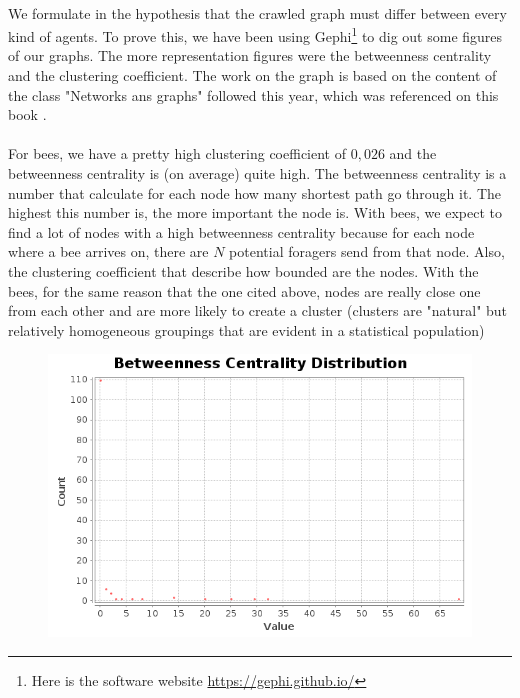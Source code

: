 \documentclass{article}
\begin{document}
		\paragraph{}
			We formulate in the hypothesis that the crawled graph must differ between every kind of agents.
			To prove this, we have been using Gephi\footnote{
				Here is the software website \url{https://gephi.github.io/}
			} to dig out some figures of our graphs.
			The more representation figures were the betweenness centrality and the clustering coefficient.
			The work on the graph is based on the content of the class "Networks ans graphs" followed this year,
			which was referenced on this book \cite{Steen10}.
		\paragraph{}
			For bees, we have a pretty high clustering coefficient of $0,026$ and the betweenness centrality is (on average) quite high.
			The betweenness centrality is a number that calculate for each node how many shortest path go through it.
			The highest this number is, the more important the node is.
			With bees, we expect to find a lot of nodes with a high betweenness centrality because for each node where a bee arrives on,
			there are $N$ potential foragers send from that node.
			Also, the clustering coefficient that describe how bounded are the nodes.
			With the bees, for the same reason that the one cited above,
			nodes are really close one from each other and are more likely to create a cluster
			(clusters are "natural" but relatively homogeneous groupings that are evident in a statistical population)
		\begin{figure}[!h]
			\includegraphics[width=1\textwidth]{dh_betweenness_centrality_bees}
		\end{figure}
\end{document}
